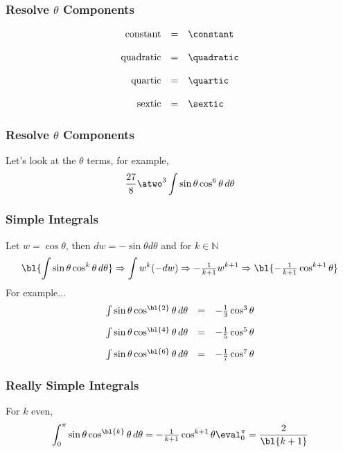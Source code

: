 \begin{frame}\frametitle{Resolve $\theta$ Components}
\begin{equation}
	\begin{array}{rcl}
		\text{constant} &=& \constant \\[12pt]
		\text{quadratic} &=& \quadratic \\[12pt]
		\text{quartic} &=& \quartic \\[12pt]
		\text{sextic} &=& \sextic \\
	\end{array}
\label{eq:cos-expansion}
\end{equation}
\end{frame}

\begin{frame}\frametitle{Resolve $\theta$ Components}
Let's look at the $\theta$ terms, for example, \\
	$$ \frac{27}{8} \atwo^{3} \int \sin \theta \cos^{6} \theta \, d\theta$$
\end{frame}


\begin{frame}\frametitle{Simple Integrals}
%
Let $w = \cos \theta$, then $dw = -\sin \theta d\theta$ and for $k\in\mathbb{N}$
%
\begin{equation}
	\bl{\int \sin\theta \cos^{k}\theta\, d\theta} \Rightarrow \int w^{k}(-dw) \Rightarrow -\tfrac{1}{k+1} w^{k+1} \Rightarrow \bl{-\tfrac{1}{k+1} \cos^{k+1} \theta}
\end{equation}
%
For example...\\
\begin{equation*}
	\begin{array}{rcl}
		\int \sin\theta \cos^{\bl{2}}\theta\, d\theta &=& -\tfrac{1}{3} \cos^{3} \theta \\[10pt]
		\int \sin\theta \cos^{\bl{4}}\theta\, d\theta &=& -\tfrac{1}{5} \cos^{5} \theta \\[10pt]
		\int \sin\theta \cos^{\bl{6}}\theta\, d\theta &=& -\tfrac{1}{7} \cos^{7} \theta 
	\end{array}
\end{equation*}
\end{frame}

\begin{frame}\frametitle{Really Simple Integrals}
For $k$ even,
\begin{equation}
	\int_{0}^{\pi} \sin \theta \cos^{\bl{k}}\theta\, d\theta = -\tfrac{1}{k+1} \cos^{k+1} \theta \eval_{0}^{\pi} = \frac{2}{\bl{k+1}}
\end{equation}
\end{frame}

